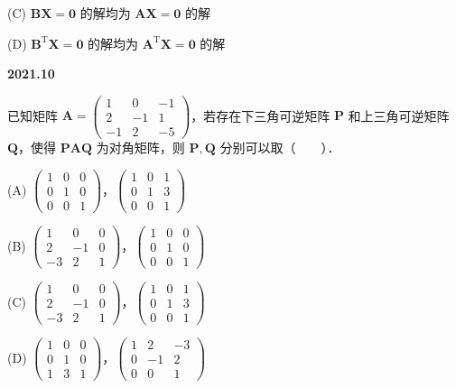 \documentclass[UTF8,12pt,fontset=windows]{ctexart}
\begin{document}
(C) $\boldsymbol{B}\boldsymbol{X} = \boldsymbol{0}$ 的解均为 $\boldsymbol{A}\boldsymbol{X} = \boldsymbol{0}$ 的解

(D) $\boldsymbol{B}^{\mathrm{T}}\boldsymbol{X} = \boldsymbol{0}$ 的解均为 $\boldsymbol{A}^{\mathrm{T}}\boldsymbol{X} = \boldsymbol{0}$ 的解

\vfill
\newpage
{\large\bfseries 2021.10}

已知矩阵 $\boldsymbol{A} = \begin{pmatrix} 1 & 0 & -1 \\ 2 & -1 & 1 \\ -1 & 2 & -5 \end{pmatrix}$，若存在下三角可逆矩阵 $\boldsymbol{P}$ 和上三角可逆矩阵 $\boldsymbol{Q}$，使得 $\boldsymbol{PAQ}$ 为对角矩阵，则 $\boldsymbol{P}, \boldsymbol{Q}$ 分别可以取（　　）．

(A) $\begin{pmatrix} 1 & 0 & 0 \\ 0 & 1 & 0 \\ 0 & 0 & 1 \end{pmatrix}$，$\begin{pmatrix} 1 & 0 & 1 \\ 0 & 1 & 3 \\ 0 & 0 & 1 \end{pmatrix}$

(B) $\begin{pmatrix} 1 & 0 & 0 \\ 2 & -1 & 0 \\ -3 & 2 & 1 \end{pmatrix}$，$\begin{pmatrix} 1 & 0 & 0 \\ 0 & 1 & 0 \\ 0 & 0 & 1 \end{pmatrix}$

(C) $\begin{pmatrix} 1 & 0 & 0 \\ 2 & -1 & 0 \\ -3 & 2 & 1 \end{pmatrix}$，$\begin{pmatrix} 1 & 0 & 1 \\ 0 & 1 & 3 \\ 0 & 0 & 1 \end{pmatrix}$

(D) $\begin{pmatrix} 1 & 0 & 0 \\ 0 & 1 & 0 \\ 1 & 3 & 1 \end{pmatrix}$，$\begin{pmatrix} 1 & 2 & -3 \\ 0 & -1 & 2 \\ 0 & 0 & 1 \end{pmatrix}$
\end{document}
